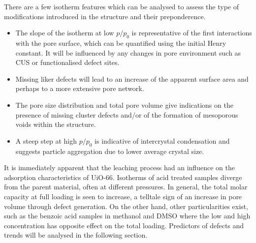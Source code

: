 There are a few isotherm features which can be analysed to
assess the type of modifications introduced in the structure
and their preponderence.

\begin{itemize}
	\item The slope of the isotherm at low \(p/p_0\) is representative
	      of the first interactions with the pore surface, which can be
	      quantified using the initial Henry constant. It will be influenced
		  by any changes in pore environment such as \gls{CUS} or functionalised
		  defect sites.
	\item Missing liker defects will lead to an increase of the
	      apparent surface area and perhaps to a more extensive
	      pore network.
	\item The pore size distribution and total pore volume give
	      indications on the presence of missing cluster defects and/or
	      of the formation of mesoporous voids within the structure.
	\item A steep step at high \(p/p_0\) is indicative of intercrystal
	      condensation and suggests particle aggregation due to lower average
	      crystal size.
\end{itemize}

It is immediately apparent that the leaching process had an influence 
on the adsorption characteristics of UiO-66. Isotherms of acid treated
samples diverge from the parent material, often at different pressures.
In general, the total molar capacity at full loading is seen to increase,
a telltale sign of an increase in pore volume through defect generation.
On the other hand, other particularities exist, such as the benzoic acid
samples in methanol and \gls{DMSO} where the low and high
concentration has opposite effect on the total loading. Predictors 
of defects and trends will be analysed in the following section.